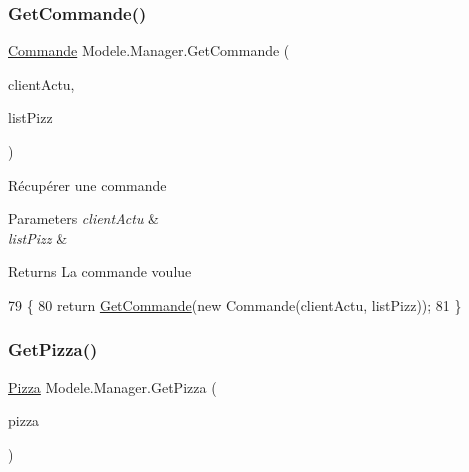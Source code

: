 \subsubsection{\texorpdfstring{Get\+Commande()}{GetCommande()}\hspace{0.1cm}{\footnotesize\ttfamily [2/2]}}
{\footnotesize\ttfamily \hyperlink{classModele_1_1Commande}{Commande} Modele.\+Manager.\+Get\+Commande (\begin{DoxyParamCaption}\item[{\hyperlink{classModele_1_1Client}{Client}}]{client\+Actu,  }\item[{Observable\+Collection$<$ \hyperlink{classModele_1_1Pizza}{Pizza} $>$}]{list\+Pizz }\end{DoxyParamCaption})\hspace{0.3cm}{\ttfamily [inline]}}



Récupérer une commande 


\begin{DoxyParams}{Parameters}
{\em client\+Actu} & \\
\hline
{\em list\+Pizz} & \\
\hline
\end{DoxyParams}
\begin{DoxyReturn}{Returns}
La commande voulue
\end{DoxyReturn}

\begin{DoxyCode}
79         \{
80             \textcolor{keywordflow}{return} \hyperlink{classModele_1_1Manager_a66c28c0c613264bb1e0b0abc1d0fc97f}{GetCommande}(\textcolor{keyword}{new} Commande(clientActu, listPizz));
81         \}
\end{DoxyCode}
\mbox{\label{classModele_1_1Manager_a8c2edb35d4e642e0478beda5f7855ca5}} 
\subsubsection{\texorpdfstring{Get\+Pizza()}{GetPizza()}\hspace{0.1cm}{\footnotesize\ttfamily [1/2]}}
{\footnotesize\ttfamily \hyperlink{classModele_1_1Pizza}{Pizza} Modele.\+Manager.\+Get\+Pizza (\begin{DoxyParamCaption}\item[{\hyperlink{classModele_1_1Pizza}{Pizza}}]{pizza }\end{DoxyParamCaption})\hspace{0.3cm}{\ttfamily [inline]}}



